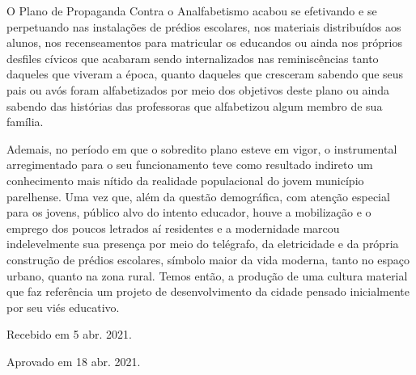 \begin{refsection}
O Plano de Propaganda Contra o Analfabetismo acabou se efetivando e se perpetuando nas instalações de prédios escolares, nos materiais distribuídos aos alunos, nos recenseamentos para matricular os educandos ou ainda nos próprios desfiles cívicos que acabaram sendo internalizados nas reminiscências tanto daqueles que viveram a época, quanto daqueles que cresceram sabendo que seus pais ou avós foram alfabetizados por meio dos objetivos deste plano ou ainda sabendo das histórias das professoras que alfabetizou algum membro de sua família. 

Ademais, no período em que o sobredito plano esteve em vigor, o instrumental arregimentado para o seu funcionamento teve como resultado indireto um conhecimento mais nítido da realidade populacional do jovem município parelhense. Uma vez que, além da questão demográfica, com atenção especial para os jovens, público alvo do intento educador, houve a mobilização e o emprego dos poucos letrados aí residentes e a modernidade marcou indelevelmente sua presença por meio do telégrafo, da eletricidade e da própria construção de prédios escolares, símbolo maior da vida moderna, tanto no espaço urbano, quanto na zona rural. Temos então, a produção de uma cultura material que faz referência um projeto de desenvolvimento da cidade pensado inicialmente por seu viés educativo.

\printbibliography[heading=subbibliography,notcategory=fullcited]

\hfill Recebido em 5 abr. 2021.

\hfill Aprovado em 18 abr. 2021.

\label{chap:decomoasletrasend}

\end{refsection}
